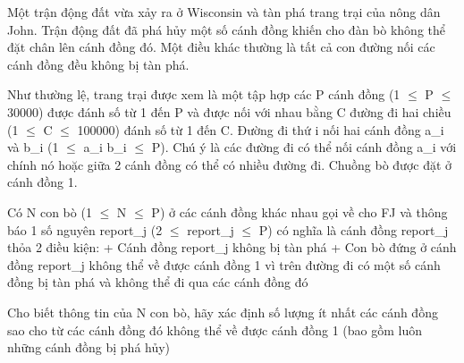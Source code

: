 Một trận động đất vừa xảy ra ở Wisconsin và tàn phá trang trại của nông dân John. Trận động đất đã phá hủy một số cánh đồng khiến cho đàn bò không thể đặt chân lên cánh đồng đó. Một điều khác thường là tất cả con đường nối các cánh đồng đều không bị tàn phá.  

   Như thường lệ, trang trại được xem là một tập hợp các P cánh đồng (1 $\le$ P $\le$ 30000) được đánh số từ 1 đến P và được nối với nhau bằng C đường đi hai chiều (1 $\le$ C $\le$ 100000) đánh số từ 1 đến C. Đường đi thứ i nối hai cánh đồng a\_i và b\_i (1 $\le$ a\_i b\_i $\le$ P). Chú ý là các đường đi có thể nối cánh đồng a\_i với chính nó hoặc giữa 2 cánh đồng có thể có nhiều đường đi. Chuồng bò được đặt ở cánh đồng 1.  

   Có N con bò (1 $\le$ N $\le$ P) ở các cánh đồng khác nhau gọi về cho FJ và thông báo 1 số nguyên report\_j (2 $\le$ report\_j $\le$ P) có nghĩa là cánh đồng report\_j thỏa 2 điều kiện: + Cánh đồng report\_j không bị tàn phá + Con bò đứng ở cánh đồng report\_j không thể về được cánh đồng 1 vì trên đường đi có một số cánh đồng bị tàn phá và không thể đi qua các cánh đồng đó  

   Cho biết thông tin của N con bò, hãy xác định số lượng ít nhất các cánh đồng sao cho từ các cánh đồng đó không thể về được cánh đồng 1 (bao gồm luôn những cánh đồng bị phá hủy)